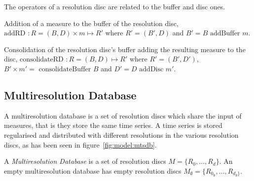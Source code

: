 
The operators of a resolution disc are related to
the buffer and disc ones.

Addition of a measure to the
buffer of the resolution disc, $\text{addRD } : R=(B,D) \times m \mapsto R'$ where
$R'= (B',D)$ and $B'= B \text{ addBuffer } m$.

Consolidation of the resolution disc's buffer adding the resulting measure to the disc,
$\text{consolidateRD } : R=(B,D) \mapsto R'$ where $R'=
(B',D')$, $B' \times m'= \text{ consolidateBuffer } B $ and $ D'= D
\text{ addDisc } m'$.




\subsection{Multiresolution Database}\label{sec:model:rrd}

A multiresolution database is a set of resolution discs which
share the input of measures, that is they store the same time
series. A time series is stored regularised and distributed with
different resolutions in the various resolution discs, as has been seen
in figure~\ref{fig:model:mtsdb}.

\begin{definition}
  A \emph{Multiresolution Database} is a set of resolution discs
  $M=\{R_0,\dotsc,R_d\}$.  An empty multiresolution database has empty
  resolution discs
  $M_{\emptyset}=\{R_{0_{\emptyset}},\dotsc,R_{d_{\emptyset}\}}$.
\end{definition}


 


